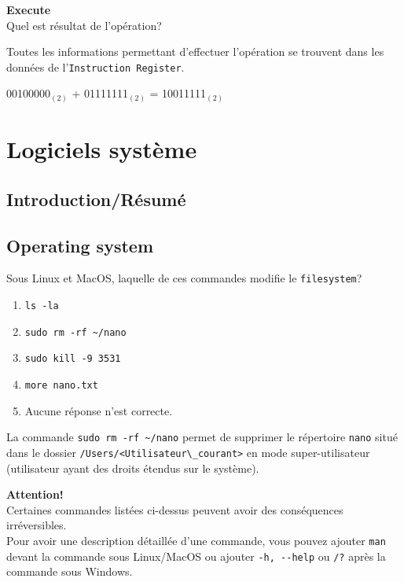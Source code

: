 \begin{Exercice}[5 minutes] \textbf{Execute}\\
    Quel est résultat de l'opération?
\end{Exercice}

   \begin{conseil}
        Toutes les informations permettant d’effectuer l’opération se trouvent dans les données de l’\lstinline{Instruction Register}.
    \end{conseil}

\begin{solution}
    00100000$_{(2)}$ + 01111111$_{(2)}$ = 10011111$_{(2)}$
\end{solution}


\section{Logiciels système}

\subsection{Introduction/Résumé}

\subsection{Operating system}

\begin{Exercice}[5 minutes]
    Sous Linux et MacOS, laquelle de ces commandes modifie le \lstinline{filesystem}?
    \begin{enumerate}
        \item \lstinline{ls -la}
        \item \lstinline{sudo rm -rf ~/nano}
        \item \lstinline{sudo kill -9 3531}
        \item \lstinline{more nano.txt}
        \item Aucune réponse n'est correcte.
    \end{enumerate}
    \begin{solution}
        La commande \lstinline{sudo rm -rf ~/nano} permet de supprimer le répertoire \lstinline{nano} situé dans le dossier \lstinline{/Users/<Utilisateur\_courant>} en mode super-utilisateur (utilisateur ayant des droits étendus sur le système).
    \end{solution}
    \begin{conseil}
        \textbf{Attention!}\\
        Certaines commandes listées ci-dessus peuvent avoir des conséquences irréversibles.\\
        Pour avoir une description détaillée d'une commande, vous pouvez ajouter \lstinline{man} devant la commande sous Linux/MacOS ou ajouter \lstinline{-h, --help} ou \lstinline{/?} après la commande sous Windows.
    \end{conseil}
\end{Exercice}

